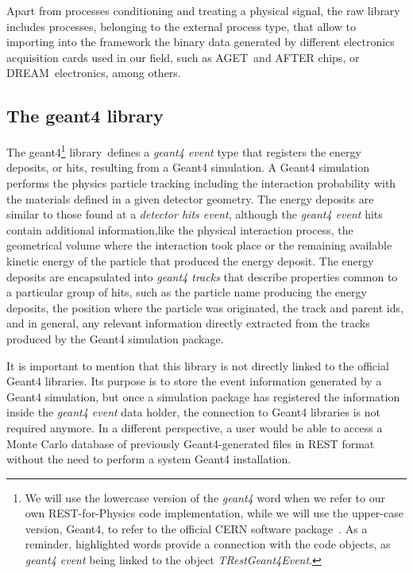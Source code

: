 Apart from processes conditioning and treating a physical signal, the raw library includes processes, belonging to the external process type, that allow to importing into the framework the binary data generated by different electronics acquisition cards used in our field, such as AGET\,\cite{6154095} and AFTER chips, or DREAM\,\cite{Acker2020} electronics, among others.

\subsection{The geant4 library}\label{sc:geant4lib}

The geant4\footnote{We will use the lowercase version of the \emph{geant4} word when we refer to our own REST-for-Physics code implementation, while we will use the upper-case version, Geant4, to refer to the official CERN software package~\cite{Agostinelli:2002hh}. As a reminder, highlighted words provide a connection with the code objects, as \emph{geant4 event} being linked to the object \emph{TRestGeant4Event}.}  library\,\cite{REST_Geant4_Git} defines a \emph{geant4 event} type that registers the energy deposits, or hits, resulting from a Geant4 simulation. A Geant4 simulation performs the physics particle tracking including the interaction probability with the materials defined in a given detector geometry. The energy deposits are similar to those found at a \emph{detector hits event}, although the \emph{geant4 event} hits contain additional information,like the physical interaction process, the geometrical volume where the interaction took place or the remaining available kinetic energy of the particle that produced the energy deposit. The energy deposits are encapsulated into \emph{geant4 tracks} that describe properties common to a particular group of hits, such as the particle name producing the energy deposits, the position where the particle was originated, the track and parent ids, and in general, any relevant information directly extracted from the tracks produced by the Geant4 simulation package.

It is important to mention that this library is not directly linked to the official Geant4 libraries. Its purpose is to store the event information generated by a Geant4 simulation, but once a simulation package has registered the information inside the \emph{geant4 event} data holder, the connection to Geant4 libraries is not required anymore. In a different perspective, a user would be able to access a Monte Carlo database of previously Geant4-generated files in REST format without the need to perform a system Geant4 installation.

